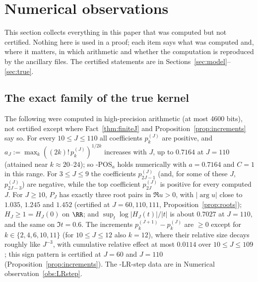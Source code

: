\section{Numerical observations}\label{sec:observations}\label{ssec:tail-obs}

This section collects everything in this paper that was computed but not certified. Nothing here is used in a proof;
each item says what was computed and, where it matters, in which arithmetic and whether the computation is reproduced by
the ancillary files. The certified statements are in Sections~\ref{sec:model}--\ref{sec:true}.

\subsection{The exact family of the true kernel}\label{ssec:obs-true}

\begin{observation}\label{obs:POS}
The following were computed in high-precision arithmetic (at most 4600 bits), not certified except where
Fact~\ref{thm:finiteJ} and Proposition~\ref{prop:increments} say so. For every $10\le J\le110$ all coefficients $p_k^{(J)}$ are positive, and
$a_J:=\max_k((2k)!\,p_k^{(J)})^{1/2k}$ increases with $J$, up to $0.7164$ at $J=110$ (attained near $k\approx20$--$24$); so \hyp{POS$_a$} holds
numerically with $a=0.7164$ and $C=1$ in this range. For $3\le J\le9$ the coefficients $p^{(J)}_{2J-1}$ (and, for some
of these $J$, $p^{(J)}_{2J-3}$) are negative, while the top coefficient $p^{(J)}_{2J}$ is positive for every computed $J$.
For $J\ge10$, $P_J$ has exactly three root pairs in $\Re u>0$, with $\lvert\arg u\rvert$ close to $1.035$, $1.245$ and $1.452$ (certified at
$J=60,110,111$, Proposition~\ref{prop:roots});
$H_J\ge1=H_J(0)$ on $\RR$; and $\sup_t\log\lvert H_J(t)\rvert/\lvert t\rvert$ is about $0.7027$ at $J=110$, and the same on $\Im t=0.6$. The
increments $p_k^{(J+1)}-p_k^{(J)}$ are $\ge0$ except for $k\in\{2,4,6,10,11\}$ (for $10\le J\le12$ also $k=12$), where
their relative size decays roughly like $J^{-3}$, with cumulative relative effect at most $0.0114$ over
$10\le J\le109$; this sign pattern is certified at $J=60$ and $J=110$ (Proposition~\ref{prop:increments}). The \hyp{LR-step} data are in
Numerical observation~\ref{obs:LRstep}.
\end{observation}

